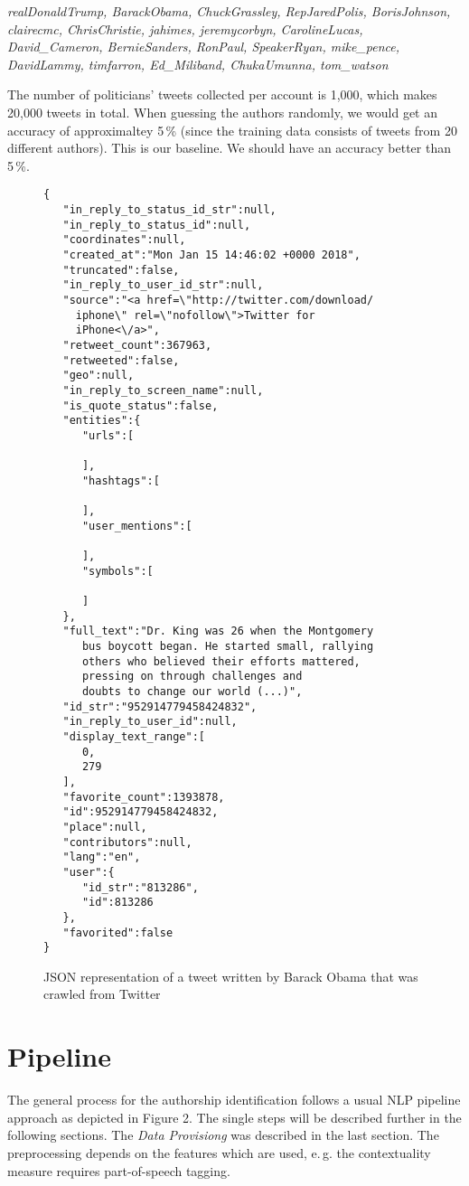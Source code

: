 \documentclass[journal, a4paper, 12pt]{IEEEtran}
\begin{document}
\footnotesize
\textit{
realDonaldTrump, BarackObama, ChuckGrassley, RepJaredPolis, BorisJohnson, clairecmc, ChrisChristie, jahimes, jeremycorbyn, CarolineLucas, David\_Cameron, BernieSanders, RonPaul, SpeakerRyan, mike\_pence, DavidLammy, timfarron, Ed\_Miliband, ChukaUmunna, tom\_watson
}
\normalsize

The number of politicians' tweets collected per account is 1,000, which makes 20,000 tweets in total. When guessing the authors randomly, we would get an accuracy of approximaltey 5\,\% (since the training data consists of tweets from 20 different authors). This is our baseline. We should have an accuracy better than 5\,\%.

\begin{figure}
\caption{JSON representation of a tweet written by Barack Obama that was crawled from Twitter}
\tiny
\begin{verbatim}
{  
   "in_reply_to_status_id_str":null,
   "in_reply_to_status_id":null,
   "coordinates":null,
   "created_at":"Mon Jan 15 14:46:02 +0000 2018",
   "truncated":false,
   "in_reply_to_user_id_str":null,
   "source":"<a href=\"http://twitter.com/download/
     iphone\" rel=\"nofollow\">Twitter for
     iPhone<\/a>",
   "retweet_count":367963,
   "retweeted":false,
   "geo":null,
   "in_reply_to_screen_name":null,
   "is_quote_status":false,
   "entities":{  
      "urls":[  

      ],
      "hashtags":[  

      ],
      "user_mentions":[  

      ],
      "symbols":[  

      ]
   },
   "full_text":"Dr. King was 26 when the Montgomery
      bus boycott began. He started small, rallying
      others who believed their efforts mattered,
      pressing on through challenges and
      doubts to change our world (...)",
   "id_str":"952914779458424832",
   "in_reply_to_user_id":null,
   "display_text_range":[  
      0,
      279
   ],
   "favorite_count":1393878,
   "id":952914779458424832,
   "place":null,
   "contributors":null,
   "lang":"en",
   "user":{  
      "id_str":"813286",
      "id":813286
   },
   "favorited":false
}
\end{verbatim}
\normalsize
\end{figure}

\section{Pipeline}
\label{sec:pipeline}
The general process for the authorship identification follows a usual NLP pipeline approach as depicted in Figure 2. The single steps will be described further in the following sections. The \textit{Data Provisiong} was described in the last section. The preprocessing depends on the features which are used, e.\,g. the contextuality measure requires part-of-speech tagging.
\end{document}
